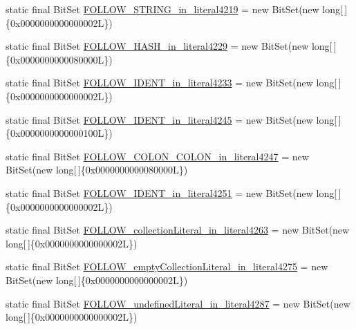 \begin{DoxyCompactItemize}
\item 
static final Bit\-Set \hyperlink{classorg_1_1tzi_1_1use_1_1parser_1_1soil_1_1_soil_parser_a3e6bbcf7c19d7758bcc77d058f9e6cdb}{F\-O\-L\-L\-O\-W\-\_\-\-S\-T\-R\-I\-N\-G\-\_\-in\-\_\-literal4219} = new Bit\-Set(new long\mbox{[}$\,$\mbox{]}\{0x0000000000000002\-L\})
\item 
static final Bit\-Set \hyperlink{classorg_1_1tzi_1_1use_1_1parser_1_1soil_1_1_soil_parser_a475b6d61a4f3288d77e364cf7ede1094}{F\-O\-L\-L\-O\-W\-\_\-\-H\-A\-S\-H\-\_\-in\-\_\-literal4229} = new Bit\-Set(new long\mbox{[}$\,$\mbox{]}\{0x0000000000080000\-L\})
\item 
static final Bit\-Set \hyperlink{classorg_1_1tzi_1_1use_1_1parser_1_1soil_1_1_soil_parser_a61b98f95f9a9342e248530128568f95b}{F\-O\-L\-L\-O\-W\-\_\-\-I\-D\-E\-N\-T\-\_\-in\-\_\-literal4233} = new Bit\-Set(new long\mbox{[}$\,$\mbox{]}\{0x0000000000000002\-L\})
\item 
static final Bit\-Set \hyperlink{classorg_1_1tzi_1_1use_1_1parser_1_1soil_1_1_soil_parser_a5f1b06d24c46de213e23cb5ce3894842}{F\-O\-L\-L\-O\-W\-\_\-\-I\-D\-E\-N\-T\-\_\-in\-\_\-literal4245} = new Bit\-Set(new long\mbox{[}$\,$\mbox{]}\{0x0000000000000100\-L\})
\item 
static final Bit\-Set \hyperlink{classorg_1_1tzi_1_1use_1_1parser_1_1soil_1_1_soil_parser_a1019c4bcb8cd34003d974051531effa9}{F\-O\-L\-L\-O\-W\-\_\-\-C\-O\-L\-O\-N\-\_\-\-C\-O\-L\-O\-N\-\_\-in\-\_\-literal4247} = new Bit\-Set(new long\mbox{[}$\,$\mbox{]}\{0x0000000000080000\-L\})
\item 
static final Bit\-Set \hyperlink{classorg_1_1tzi_1_1use_1_1parser_1_1soil_1_1_soil_parser_a927381f36aba688aa0bdb66207a1f13d}{F\-O\-L\-L\-O\-W\-\_\-\-I\-D\-E\-N\-T\-\_\-in\-\_\-literal4251} = new Bit\-Set(new long\mbox{[}$\,$\mbox{]}\{0x0000000000000002\-L\})
\item 
static final Bit\-Set \hyperlink{classorg_1_1tzi_1_1use_1_1parser_1_1soil_1_1_soil_parser_abe5deb9177e8d8229eb856d092aec078}{F\-O\-L\-L\-O\-W\-\_\-collection\-Literal\-\_\-in\-\_\-literal4263} = new Bit\-Set(new long\mbox{[}$\,$\mbox{]}\{0x0000000000000002\-L\})
\item 
static final Bit\-Set \hyperlink{classorg_1_1tzi_1_1use_1_1parser_1_1soil_1_1_soil_parser_ab5954f0d3c4b7b07665544cca9dfc42e}{F\-O\-L\-L\-O\-W\-\_\-empty\-Collection\-Literal\-\_\-in\-\_\-literal4275} = new Bit\-Set(new long\mbox{[}$\,$\mbox{]}\{0x0000000000000002\-L\})
\item 
static final Bit\-Set \hyperlink{classorg_1_1tzi_1_1use_1_1parser_1_1soil_1_1_soil_parser_aeb84bff8754a1acb3d3c3c2385ee4f90}{F\-O\-L\-L\-O\-W\-\_\-undefined\-Literal\-\_\-in\-\_\-literal4287} = new Bit\-Set(new long\mbox{[}$\,$\mbox{]}\{0x0000000000000002\-L\})

\end{DoxyCompactItemize}
